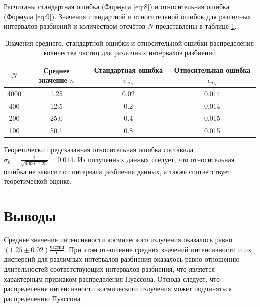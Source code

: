 \documentclass[12pt]{article}
\begin{document}
Расчитаны стандартная ошибка (Формула \ref{eq:8}) и относительная ошибка (Формула \ref{eq:9}).
Значения стандартной и относительной ошибок для различных интервалов разбиений и количеством отсчётов $N$ представлены в таблице \ref{tab:5}.
\begin{table}[H]
    \begin{center}
        \begin{tabular}{|c|c|c|c|}
            \hline
            $N$  & Среднее значение $\overline{n}$ & Стандартная ошибка $\sigma_{\overline{n}_N}$ & Относительная ошибка $\epsilon_{\overline{n}_N}$ \\
            \hline
            4000 & 1.25                             & 0.02                                          & 0.014                                             \\
            400  & 12.5                             & 0.2                                           & 0.014                                             \\
            200  & 25.0                             & 0.4                                           & 0.015                                             \\
            100  & 50.1                             & 0.8                                           & 0.015                                             \\
            \hline
        \end{tabular}
    \end{center}
    \caption{Значения среднего, стандартной ошибки и относительной ошибки распределения количества частиц для различных интервалов разбиений}
    \label{tab:5}
\end{table}
Теоретически предсказанная относительная ошибка составила $\sigma_{\overline{n}} = \frac{1}{\sqrt{4000\cdot1.25}} = 0.014$.
Из полученных данных следует, что относительная ошибка не зависит от интервала разбиения данных, а также соответствует теоретической оценке.

\section{Выводы}
Cреднее значение интенсивности космического излучения оказалось равно $(1.25 \pm 0.02)\frac{\textrm{частиц}}{\textrm{с}}$.
При этом отношение средних значений интенсивности и их дисперсий для различных интервалов разбиения оказалось равно отношению длительностей 
соответствующих интервалов разбиения, что является характерным признаком распределения Пуассона.
Отсюда следует, что распределение интенсивности космического излучения может подчиняться распределению Пуассона.
\end{document}
